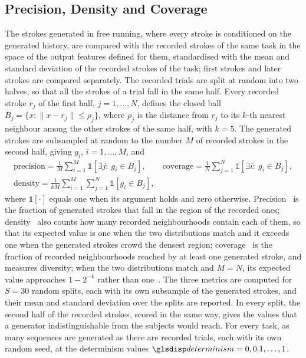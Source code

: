 \documentclass[12pt]{report}
\begin{document}
\subsection{Precision, Density and Coverage}
\label{sec:precision_density_coverage}
The strokes generated in free running, where every stroke is conditioned on the generated history, are compared with the recorded strokes of the same task in the space of the output features defined for them, standardised with the mean and standard deviation of the recorded strokes of the task; first strokes and later strokes are compared separately. The recorded trials are split at random into two halves, so that all the strokes of a trial fall in the same half. Every recorded stroke $r_j$ of the first half, $j=1,\dots,N$, defines the closed ball $B_j=\{x:\lVert x-r_j\rVert\le\rho_j\}$, where $\rho_j$ is the distance from $r_j$ to its $k$-th nearest neighbour among the other strokes of the same half, with $k=5$. The generated strokes are subsampled at random to the number $M$ of recorded strokes in the second half, giving $g_i$, $i=1,\dots,M$, and
\begin{equation}
    \begin{gathered}
        \text{precision}=\frac1M\sum_{i=1}^{M}\mathds 1\left[\exists j:\ g_i\in B_j\right],\qquad
        \text{coverage}=\frac1N\sum_{j=1}^{N}\mathds 1\left[\exists i:\ g_i\in B_j\right],\\
        \text{density}=\frac1{kM}\sum_{i=1}^{M}\sum_{j=1}^{N}\mathds 1\left[g_i\in B_j\right],
    \end{gathered}
\end{equation}
where $\mathds 1[\cdot]$ equals one when its argument holds and zero otherwise.
Precision~\cite{kynkaanniemi2019improved} is the fraction of generated strokes that fall in the region of the recorded ones; density~\cite{naeem2020reliable} also counts how many recorded neighbourhoods contain each of them, so that its expected value is one when the two distributions match and it exceeds one when the generated strokes crowd the densest region; coverage~\cite{naeem2020reliable} is the fraction of recorded neighbourhoods reached by at least one generated stroke, and measures diversity; when the two distributions match and $M=N$, its expected value approaches $1-2^{-k}$ rather than one~\cite{naeem2020reliable}. The three metrics are computed for $S=30$ random splits, each with its own subsample of the generated strokes, and their mean and standard deviation over the splits are reported. In every split, the second half of the recorded strokes, scored in the same way, gives the values that a generator indistinguishable from the subjects would reach. For every task, as many sequences are generated as there are recorded trials, each with its own random seed, at the determinism values $\sym{determinism}=0,0.1,\dots,1$.
\end{document}
